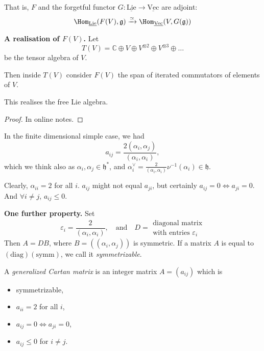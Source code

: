 That is, $F$ and the 
forgetful functor $G:\underline{\text{Lie}}\to \underline{\text{Vec}}$
are adjoint:
$$
\Hom_{\underline{\text{Lie}}}(F(V),\mathfrak{g})
\xrightarrow{\simeq }
\Hom_{\underline{\text{Vec}}}(V,G(\mathfrak{g}))
$$

\medskip\noindent
{\bf A realisation of $F(V)$.} Let 
$$
T(V)=\mathbb{C} \oplus V \oplus V^{\otimes 2}\oplus V^{\otimes 3}\oplus\ldots
$$
be the tensor algebra of $V$. 

Then inside $T(V)$ consider $F(V)$ the span of iterated commutators of elements
of  $V$.

\begin{proposition}
\label{proposition-this-realises-the-free-Lie-algebra}
This realises the free Lie algebra.
\end{proposition}

\begin{proof}
In online notes.
\end{proof}

\medskip\noindent
In the finite dimensional simple case, we had
$$
a_{ij}=\frac{2(\alpha_i,\alpha_j)}{(\alpha_i,\alpha_i)},
$$
which we think also as $\alpha_i,\alpha_j \in \mathfrak{h}^*$, 
and $\alpha_i^\vee=\frac{2}{(\alpha_i,\alpha_i)}\nu^{-1}(\alpha_i) 
\in \mathfrak{h}.$

Clearly, $\alpha_{ii}=2$ for all $i$. 
$a_{ij}$ might not equal $a_{ji}$, but certainly $a_{ij}=0 \iff a_{ji}=0$. 
And $\forall  i \neq j$, $a_{ij} \leq 0$.

\medskip\noindent
{\bf One further property.} Set
$$
\varepsilon_i=\frac{2}{(\alpha_i,\alpha_i)},\quad \text{and}\quad 
D=\substack{\text{diagonal matrix} \\ \text{with entries }\varepsilon_i}
$$
Then $A=DB$, where $B=((\alpha_i,\alpha_j))$ is symmetric. 
If a matrix $A$ is equal to $(\text{diag})(\text{symm})$, we call it
 {\it symmetrizable}.

\begin{definition}
\label{definition-generalized-Cartan-matrix}
A {\it generalized Cartan matrix} is an integer matrix $A=(a_{ij})$ 
which is
\begin{itemize}
\item symmetrizable,
\item $a_{ii}=2$ for all $i$,
\item $a_{ij}=0 \iff a_{ji}=0$,
\item $a_{ij}\leq 0$ for $i \neq j$.
\end{itemize}
\end{definition}

